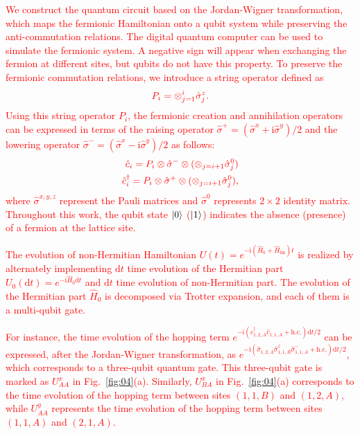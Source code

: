 \documentclass[longbibliography, aps, prx, amsmath, amssymb, amsfonts, twocolumn,superscriptaddress, footinbib]{revtex4-1}
\begin{document}
	\textcolor{red}{We construct the quantum circuit based on the Jordan-Wigner transformation, which maps the fermionic Hamiltonian onto a qubit system while preserving the anti-commutation relations.} \textcolor{red}{The digital quantum computer can be used to simulate the fermionic system. A negative sign will appear when exchanging the fermion at different sites, but qubits do not have this property. To preserve the fermionic commutation relations, we introduce a string operator defined as}
	\begin{equation}
		\textcolor{red}{P_i = \otimes_{j=1}^i\hat{\sigma}^z_j.}
	\end{equation}
	\textcolor{red}{Using this string operator $P_i$, the fermionic creation and annihilation operators can be expressed in terms of the raising operator $\hat{\sigma}^+=(\hat{\sigma}^x+\mathrm{i}\hat{\sigma}^y)/2$ and the lowering operator $\hat{\sigma}^-=(\hat{\sigma}^x-\mathrm{i}\hat{\sigma}^y)/2$ as follows:}
	\begin{equation}
		\textcolor{red}{
		\begin{split}
			\hat{c}_i = P_i \otimes \hat{\sigma}^{-}\otimes (\otimes_{j=i+1}\hat{\sigma}^0_j)\\
			\hat{c}_i^{\dagger} = P_i \otimes \hat{\sigma}^{+}\otimes (\otimes_{j=i+1}\hat{\sigma}^0_j),
		\end{split}}
	\end{equation}
	\textcolor{red}{where $\hat{\sigma}^{x,y,z}$ represent the Pauli matrices and $\hat{\sigma}^0$ represents $2\times 2$ identity matrix. Throughout this work, the qubit state $\ket{0}$ ($\ket{1}$) indicates the absence (presence) of a fermion at the lattice site.}
	
	\textcolor{red}{The evolution of non-Hermitian Hamiltonian $U(t) = e^{-\mathrm{i}(\hat{H}_0 + \hat{H}_{\text{im}})t}$ is realized by alternately implementing $\mathrm{d} t$ time evolution of the Hermitian part $U_0(\mathrm{d}t)=e^{-\mathrm{i}\hat{H}_0 \mathrm{d}t}$ and $\mathrm{d} t$ time evolution of non-Hermitian part. The evolution of the Hermitian part $\hat{H}_0$ is decomposed via Trotter expansion, and each of them is a multi-qubit gate.}
	
	\textcolor{red}{For instance, the time evolution of the hopping term $e^{-\mathrm{i}  (\hat{c}_{1,2,A}^{\dagger} \hat{c}_{1,1,A} +\text{h.c.})\mathrm{d} t/2}$ can be expressed, after the Jordan-Wigner transformation, as $e^{-\mathrm{i} (\hat{\sigma}_{1,2,A} \hat{\sigma}^z_{1,1,B}\hat{\sigma}_{1,1,A}^{-} +\text{h.c.})\mathrm{d} t /2}$, which corresponds to a three-qubit quantum gate. This three-qubit gate is marked as $U_{AA}^x$ in Fig.~\ref{fig:04}(a). Similarly, $U_{BA}^x$ in Fig.~\ref{fig:04}(a) corresponds to the time evolution of the hopping term between sites $(1,1,B)$ and $(1,2,A)$, while $U_{AA}^y$ represents the time evolution of the hopping term between sites $(1,1,A)$ and $(2,1,A)$.}
	
\end{document}
